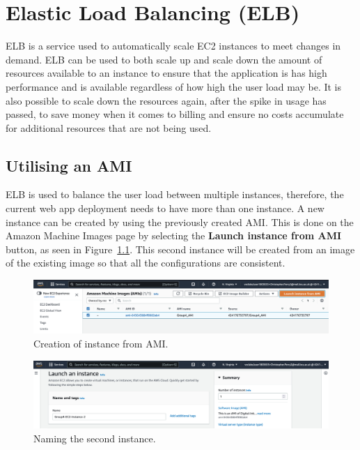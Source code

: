\chapter{Elastic Load Balancing (ELB)}\label{ch:elastic-load-balancing}

ELB is a service used to automatically scale EC2 instances to meet changes in demand.
ELB can be used to both scale up and scale down the amount of resources available to an instance to ensure that the 
application is has high performance and is available regardless of how high the user load may be.
It is also possible to scale down the resources again, after the spike in usage has passed, to save money when it comes
to billing and ensure no costs accumulate for additional resources that are not being used.

\section{Utilising an AMI}\label{sec:creation-an-ami}

ELB is used to balance the user load between multiple instances, therefore, the current web app deployment needs to
have more than one instance.
A new instance can be created by using the previously created AMI\@.
This is done on the Amazon Machine Images page by selecting the \textbf{Launch instance from AMI} button,
as seen in Figure~\ref{fig:elb-instance-from-ami}.
This second instance will be created from an image of the existing image so that all the configurations
are consistent.

\begin{figure}[!htbp]
	  \centering
	  \includegraphics[width=\textwidth]{resources/elb/elb-instance-from-ami}
	  \caption{Creation of instance from AMI.}
	  \label{fig:elb-instance-from-ami}
\end{figure}

\begin{figure}[!htbp]
	  \centering
	  \includegraphics[width=\textwidth]{resources/elb/elb-inst-2-named}
	  \caption{Naming the second instance.}
	  \label{fig:elb-instance-2-name}
\end{figure}


